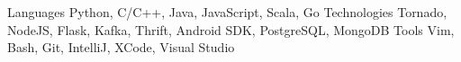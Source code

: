 \begin{cvskills}
  \cvskill
    {Languages}
    {Python, C/C++, Java, JavaScript, Scala, Go}
  \cvskill
    {Technologies}
    {Tornado, NodeJS, Flask, Kafka, Thrift, Android SDK, PostgreSQL, MongoDB}
  \cvskill
    {Tools}
    {Vim, Bash, Git, IntelliJ, XCode, Visual Studio}
\end{cvskills}
